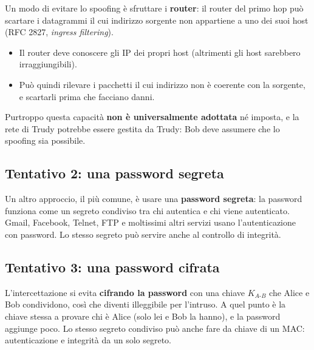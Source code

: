 Un modo di evitare lo spoofing è sfruttare i \textbf{router}: il router del primo hop può scartare i datagrammi il cui indirizzo sorgente non
appartiene a uno dei suoi host (RFC 2827, \emph{ingress filtering}).

\begin{itemize}
    \item Il router deve conoscere gli IP dei propri host (altrimenti gli host sarebbero irraggiungibili).
    \item Può quindi rilevare i pacchetti il cui indirizzo non è coerente con la sorgente, e scartarli prima che facciano danni.
\end{itemize}

Purtroppo questa capacità \textbf{non è universalmente adottata} né imposta, e la rete di Trudy potrebbe essere gestita da Trudy: Bob
deve assumere che lo spoofing sia possibile.

\subsection{Tentativo 2: una password segreta}

Un altro approccio, il più comune, è usare una \textbf{password segreta}: la password funziona come un segreto condiviso tra chi autentica e chi
viene autenticato. Gmail, Facebook, Telnet, FTP e moltissimi altri servizi usano l'autenticazione con password. Lo stesso segreto può servire
anche al controllo di integrità.


\subsection{Tentativo 3: una password cifrata}

L'intercettazione si evita \textbf{cifrando la password} con una chiave $K_{A\text{-}B}$ che Alice e Bob condividono, così che diventi
illeggibile per l'intruso. A quel punto è la chiave stessa a provare chi è Alice (solo lei e Bob la hanno), e la password aggiunge poco.
Lo stesso segreto condiviso può anche fare da chiave di un MAC: autenticazione e integrità da un solo segreto.

